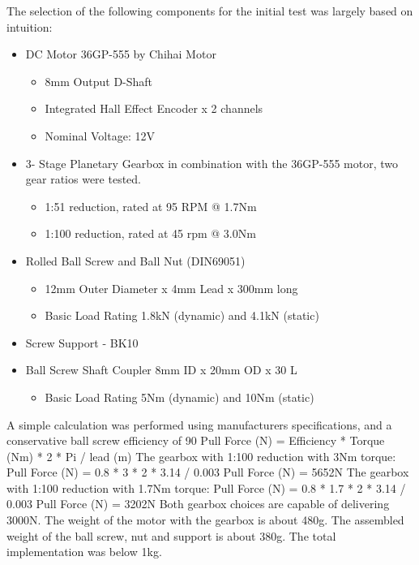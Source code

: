 The selection of the following components for the initial test was largely based on intuition:
\begin{itemize}
    \item DC Motor 36GP-555 by Chihai Motor
        \begin{itemize}
        \item 8mm Output D-Shaft 
        \item Integrated Hall Effect Encoder x 2 channels
        \item Nominal Voltage: 12V
        \end{itemize}
    \item 3- Stage Planetary Gearbox in combination with the 36GP-555 motor, two gear ratios were tested.
        \begin{itemize}
        \item 1:51 reduction, rated at 95 RPM @ 1.7Nm
        \item 1:100 reduction, rated at 45 rpm @ 3.0Nm
        \end{itemize} 
    \item  Rolled Ball Screw and Ball Nut (DIN69051)
        \begin{itemize}
        \item 12mm Outer Diameter x 4mm Lead x 300mm long
        \item Basic Load Rating 1.8kN (dynamic) and 4.1kN (static)
        \end{itemize}
    \item Screw Support - BK10
    \item Ball Screw Shaft Coupler 8mm ID x 20mm OD x 30 L
        \begin{itemize}
        \item Basic Load Rating 5Nm (dynamic) and 10Nm (static)
        \end{itemize}
    \end{itemize}

    A simple calculation was performed using manufacturers specifications, and a conservative ball screw efficiency of 90%
Pull Force (N) = Efficiency * Torque (Nm) * 2 * Pi / lead (m)
The gearbox with 1:100 reduction with 3Nm torque:
Pull Force (N) = 0.8 * 3 * 2 * 3.14 / 0.003
Pull Force (N) = 5652N
The gearbox with 1:100 reduction with 1.7Nm torque:
Pull Force (N) = 0.8 * 1.7 * 2 * 3.14 / 0.003
Pull Force (N) = 3202N
Both gearbox choices are capable of delivering 3000N. The weight of the motor with the gearbox is about 480g. The assembled weight of the ball screw, nut and support is about 380g. The total implementation was below 1kg. 

